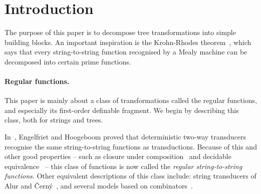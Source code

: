 
\section{Introduction}

The purpose of this paper is to decompose tree transformations into simple building blocks. An important inspiration  is the Krohn-Rhodes theorem~\cite[p.~454]{Krohn1965}, which says that every string-to-string function recognised by a Mealy machine can be decomposed into certain prime functions. 

\paragraph*{Regular functions.} This paper is mainly about a class of transformations called the regular functions, and especially its first-order definable fragment.  We begin by describing this class, both for strings and trees. 

In~\cite[Theorem 13]{engelfrietMSODefinableString2001}, Engelfriet and Hoogeboom proved that deterministic two-way transducers recognise the same string-to-string functions as \mso transductions. Because of this and other good properties -- such as closure under composition~\cite[Theorem 1]{chytilSerialComposition2Way1977} and decidable equivalence~\cite[Theorem 1]{gurariEquivalenceProblemDeterministic1982} --  this class of functions is now called the \emph{regular string-to-string functions}. Other  equivalent descriptions of this class include: string transducers of Alur and {\v C}ern{\'y}~\cite{alurExpressivenessStreamingString2010}, and several models based on combinators~\cite{alur2014regular,daveGastinKrishna18, bojanczykRegularFirstOrderList2018}. 
 

